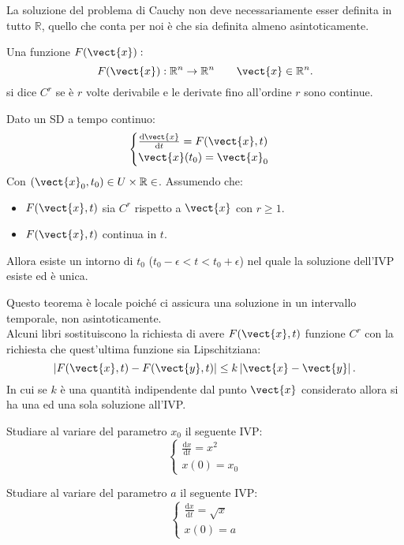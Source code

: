 \noindent
La soluzione del problema di Cauchy non deve necessariamente esser definita in tutto $\mathbb{R}$, quello che conta per noi è che sia definita almeno asintoticamente.
\begin{defn}[Funzione $C^r$]
    Una funzione $F(\vect{x}):$
    \[
	F(\vect{x}): \mathbb{R}^n\to \mathbb{R}^n \qquad \vect{x}\in \mathbb{R}^n
    .\] si dice $C^r$ se è $r$ volte derivabile e le derivate fino all'ordine $r$ sono continue.
\end{defn}
\noindent
\begin{thm}
   Dato un SD a tempo continuo:
   \[
       \begin{cases}
	   \frac{\text{d} \vect{x}}{\text{d} t} = F(\vect{x}, t)\\
	   \vect{x} (t_0) = \vect{x}_0
       \end{cases}
   \] 
   Con $\left(\vect{x}_0, t_0\right) \in U\times \mathbb{R} \in $. Assumendo che:
   \begin{itemize}
       \item $F(\vect{x},t)$ sia $C^r$ rispetto a $\vect{x}$ con $r\ge 1$.
       \item $F(\vect{x}, t)$ continua in $t$.
   \end{itemize}
   Allora esiste un intorno di $t_0$ ($t_0-\epsilon  < t < t_0+\epsilon$) nel quale la soluzione dell'IVP esiste ed è unica.
\end{thm}
\noindent
Questo teorema è locale poiché ci assicura una soluzione in un intervallo temporale, non asintoticamente.\\
Alcuni libri sostituiscono la richiesta di avere $F(\vect{x}, t)$ funzione $C^r$ con la richiesta che quest'ultima funzione sia Lipschitziana:
\[
    \left|F(\vect{x}, t)-F(\vect{y}, t)\right| \le k \left|\vect{x}-\vect{y}\right|
.\] 
In cui se $k$  è una quantità indipendente dal punto $\vect{x}$  considerato allora si ha una ed una sola soluzione all'IVP.
\begin{ex}[Esercizio]
    Studiare al variare del parametro $x_0$  il seguente IVP:
    \[
        \begin{cases}
            \frac{\text{d} x}{\text{d} t} = x^2\\
	    x(0) = x_0
        \end{cases}
    \] 
\end{ex}
\noindent
\begin{ex}[Esercizio]
    Studiare al variare del parametro $a$ il seguente IVP:
    \[
        \begin{cases}
            \frac{\text{d} x}{\text{d} t} = \sqrt{x} \\
	    x(0)=a
        \end{cases}
    \] 
\end{ex}
